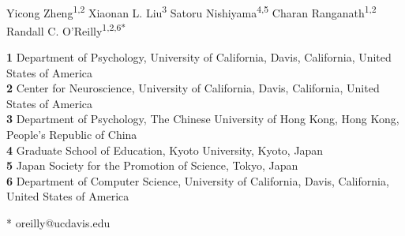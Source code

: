 \documentclass[10pt,letterpaper]{article}
\begin{document}
\vspace*{0.2in}

\begin{flushleft}
{\Large
\textbf{} %
}
\newline
\\
Yicong Zheng\textsuperscript{1,2}
Xiaonan L. Liu\textsuperscript{3}
Satoru Nishiyama\textsuperscript{4,5}
Charan Ranganath\textsuperscript{1,2}
Randall C. O'Reilly\textsuperscript{1,2,6*}



\bigskip
\textbf{1} Department of Psychology, University of California, Davis, California, United States of America
\\
\textbf{2} Center for Neuroscience, University of California, Davis, California, United States of America
\\
\textbf{3} Department of Psychology, The Chinese University of Hong Kong, Hong Kong, People's Republic of China
\\
\textbf{4} Graduate School of Education, Kyoto University, Kyoto, Japan
\\
\textbf{5} Japan Society for the Promotion of Science, Tokyo, Japan
\\
\textbf{6} Department of Computer Science, University of California, Davis, California, United States of America
\\
\bigskip

% 
%





* oreilly@ucdavis.edu

\end{flushleft}
\end{document}
